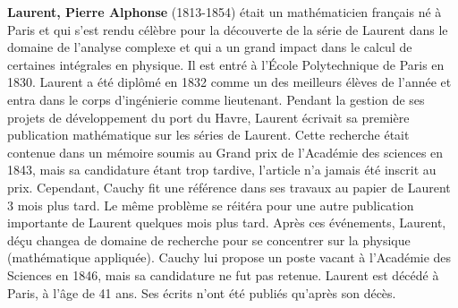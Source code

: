 \textbf{Laurent, Pierre Alphonse} (1813-1854) était un mathématicien français né à Paris et qui s'est rendu célèbre pour la découverte de la série de Laurent dans le domaine de l'analyse complexe et qui a un grand impact dans le calcul de certaines intégrales en physique. Il est entré à l'École Polytechnique de Paris en 1830. Laurent a été diplômé en 1832 comme un des meilleurs élèves de l'année et entra dans le corps d'ingénierie comme lieutenant. Pendant la gestion de ses projets de développement du port du Havre, Laurent écrivait sa première publication mathématique sur les séries de Laurent. Cette recherche était contenue dans un mémoire soumis au Grand prix de l'Académie des sciences en 1843, mais sa candidature étant trop tardive, l'article n'a jamais été inscrit au prix. Cependant, Cauchy fit une référence dans ses travaux au papier de Laurent 3 mois plus tard. Le même problème se réitéra pour une autre publication importante de Laurent quelques mois plus tard. Après ces événements, Laurent, déçu changea de domaine de recherche pour se concentrer sur la physique (mathématique appliquée). Cauchy lui propose un poste vacant à l'Académie des Sciences en 1846, mais sa candidature ne fut pas retenue. Laurent est décédé à Paris, à l'âge de 41 ans. Ses écrits n'ont été publiés qu'après son décès.

